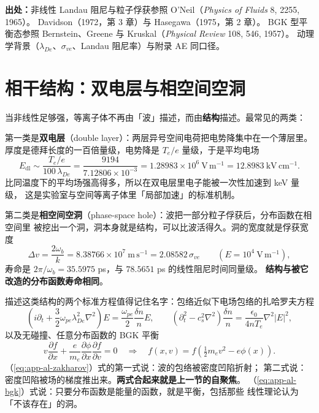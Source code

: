 {\footnotesize
\textbf{出处：}非线性 Landau 阻尼与粒子俘获参照 O'Neil（\emph{Physics of Fluids} 8, 2255, 1965）。
Davidson（1972，第 3 章）与 Hasegawa（1975，第 2 章）。
BGK 型平衡态参照
Bernstein、Greene 与 Kruskal（\emph{Physical Review} 108, 546, 1957）。
动理学背景（$\lambda_{De}$、$\sigma_{ve}$、Landau 阻尼率）与附录 AE 同口径。
}

\section{相干结构：双电层与相空间空洞}
\label{sec:app-al-structures}

当非线性足够强，等离子体不再由「波」描述，而由\textbf{结构}描述。最常见的两类：

第一类是\textbf{双电层}（double layer）：两层异号空间电荷把电势降集中在一个薄层里。
厚度是德拜长度的一百倍量级，电势降是 $T_e/e$ 量级，于是平均电场
\begin{equation}
E_{\mathrm{dl}} \sim \frac{T_e/e}{100\,\lambda_{De}}
= \frac{9194}{7.12806\times10^{-3}} = 1.28983\times10^{6}\ \mathrm{V\,m^{-1}}
= 12.8983\ \mathrm{kV\,cm^{-1}} .
\label{eq:app-al-dl}
\end{equation}
比同温度下的平均场强高得多，所以在双电层里电子能被一次性加速到 keV 量级，
这是实验室与空间等离子体里「局部加速」的标准机制。

第二类是\textbf{相空间空洞}（phase-space hole）：波把一部分粒子俘获后，分布函数在相空间里
被挖出一个洞，洞本身就是结构，可以比波活得久。洞的宽度就是俘获宽度
\begin{equation}
\Delta v = \frac{2\omega_b}{k} = 8.38766\times10^{7}\ \mathrm{m\,s^{-1}}
= 2.08582\,\sigma_{ve}
\qquad (E = 10^{4}\ \mathrm{V\,m^{-1}}),
\label{eq:app-al-hole}
\end{equation}
寿命是 $2\pi/\omega_b = 35.5975$ ps，与 $78.5651$ ps 的线性阻尼时间同量级。
\textbf{结构与被它改造的分布函数寿命相同}。

描述这类结构的两个标准方程值得记住名字：包络近似下电场包络的扎哈罗夫方程
\begin{equation}
\left(i\partial_t + \frac{3}{2}\omega_{pe}\lambda_{De}^2\nabla^2\right)E
= \frac{\omega_{pe}}{2}\frac{\delta n}{n}E ,
\qquad
\left(\partial_t^2 - c_s^2\nabla^2\right)\frac{\delta n}{n}
= \frac{\epsilon_0}{4nT_e}\nabla^2|E|^2 ,
\label{eq:app-al-zakharov}
\end{equation}
以及无碰撞、任意分布函数的 BGK 平衡
\begin{equation}
v\frac{\partial f}{\partial x} + \frac{e}{m_e}\frac{\partial\phi}{\partial x}
\frac{\partial f}{\partial v} = 0
\quad\Longrightarrow\quad
f(x,v) = f\!\left(\tfrac{1}{2}m_ev^2 - e\phi(x)\right) .
\label{eq:app-al-bgk}
\end{equation}
（\ref{eq:app-al-zakharov}）式的第一式说：波的包络被密度凹陷折射；
第二式说：密度凹陷被场的梯度推出来。\textbf{两式合起来就是上一节的自聚焦}。
（\ref{eq:app-al-bgk}）式说：只要分布函数是能量的函数，就是平衡，包括那些
线性理论认为「不该存在」的洞。

